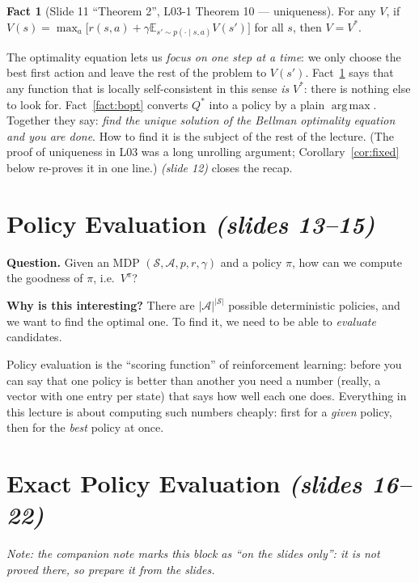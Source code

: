 \documentclass[11pt,a4paper]{article}
\newcommand{\E}{\mathbb{E}}
\newcommand{\cS}{\mathcal{S}}
\newcommand{\cA}{\mathcal{A}}
\DeclareMathOperator*{\argmax}{arg\,max}
\newcommand{\slides}[1]{\texorpdfstring{\emph{(slides #1)}}{(slides #1)}}
\newcommand{\slide}[1]{\texorpdfstring{\emph{(slide #1)}}{(slide #1)}}
\theoremstyle{plain}
\theoremstyle{definition}
\newtheorem{fact}{Fact}\renewcommand{\thefact}{F\arabic{fact}}
\theoremstyle{remark}
\begin{document}
\begin{fact}[Slide 11 ``Theorem 2'', L03-1 Theorem 10 --- uniqueness]\label{fact:uniq}
For any $V$, if $V(s)=\max_a\big[r(s,a)+\gamma\E_{s'\sim p(\cdot\mid s,a)}V(s')\big]$ for all $s$, then $V=V^*$.
\end{fact}

\begin{intuition}
The optimality equation lets us \emph{focus on one step at a time}: we only choose the best first action and leave the rest of the problem to $V(s')$. Fact~\ref{fact:uniq} says that any function that is locally self-consistent in this sense \emph{is} $V^*$: there is nothing else to look for. Fact~\ref{fact:bopt} converts $Q^*$ into a policy by a plain $\argmax$. Together they say: \emph{find the unique solution of the Bellman optimality equation and you are done}. How to find it is the subject of the rest of the lecture. (The proof of uniqueness in L03 was a long unrolling argument; Corollary~\ref{cor:fixed} below re-proves it in one line.) \slide{12} closes the recap.
\end{intuition}
\section{Policy Evaluation \slides{13--15}}
\textbf{Question.} Given an MDP $(\cS,\cA,p,r,\gamma)$ and a policy $\pi$, how can we compute the goodness of $\pi$, i.e.\ $V^\pi$?

\textbf{Why is this interesting?} There are $|\cA|^{|\cS|}$ possible deterministic policies, and we want to find the optimal one. To find it, we need to be able to \emph{evaluate} candidates.

\begin{intuition}
Policy evaluation is the ``scoring function'' of reinforcement learning: before you can say that one policy is better than another you need a number (really, a vector with one entry per state) that says how well each one does. Everything in this lecture is about computing such numbers cheaply: first for a \emph{given} policy, then for the \emph{best} policy at once.
\end{intuition}

\section{Exact Policy Evaluation \slides{16--22}}\label{sec:exact}
\emph{Note: the companion note marks this block as ``on the slides only'': it is not proved there, so prepare it from the slides.}
\end{document}
